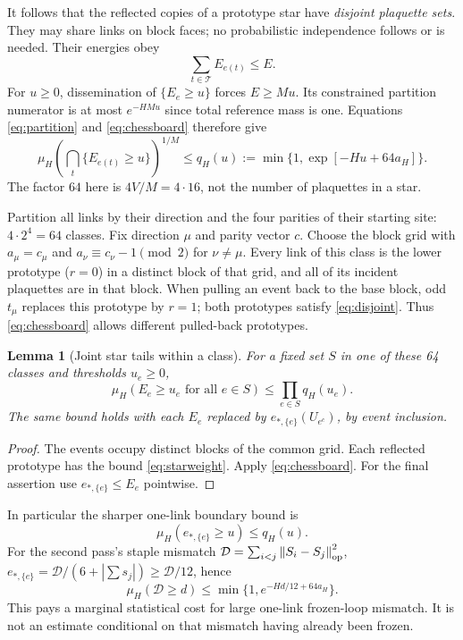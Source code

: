 \documentclass[11pt]{article}
\newtheorem{lemma}[theorem]{Lemma}
\theoremstyle{remark}
\newcommand{\norm}[1]{\left\lVert#1\right\rVert}
\begin{document}
It follows that the reflected copies of a prototype star have
\emph{disjoint plaquette sets}. They may share links on block faces;
no probabilistic independence follows or is needed. Their energies obey
\begin{equation}
 \sum_{t\in\mathcal T}E_{e(t)}\le E.
 \label{eq:disjoint}
\end{equation}
For $u\ge0$, dissemination of $\{E_e\ge u\}$ forces $E\ge Mu$.
Its constrained partition numerator is at most $e^{-HMu}$ since total
reference mass is one. Equations \eqref{eq:partition} and
\eqref{eq:chessboard} therefore give
\begin{equation}
 \mu_H\!\left(\bigcap_t\{E_{e(t)}\ge u\}\right)^{1/M}
 \le q_H(u):=\min\{1,\exp[-Hu+64a_H]\}.
 \label{eq:starweight}
\end{equation}
The factor $64$ here is $4V/M=4\cdot16$, not the number of plaquettes
in a star.

Partition all links by their direction and the four parities of their
starting site: $4\cdot2^4=64$ classes. Fix direction $\mu$ and parity
vector $c$. Choose the block grid with
$a_\mu=c_\mu$ and $a_\nu\equiv c_\nu-1\pmod2$ for $\nu\ne\mu$.
Every link of this class is the lower prototype ($r=0$) in a distinct
block of that grid, and all of its incident plaquettes are in that block.
When pulling an event back to the base block, odd $t_\mu$ replaces this
prototype by $r=1$; both prototypes satisfy \eqref{eq:disjoint}.
Thus \eqref{eq:chessboard} allows different pulled-back prototypes.

\begin{lemma}[Joint star tails within a class]\label{lem:classtails}
For a fixed set $S$ in one of these 64 classes and thresholds $u_e\ge0$,
\begin{equation}
 \mu_H(E_e\ge u_e\text{ for all }e\in S)
 \le\prod_{e\in S}q_H(u_e).
 \label{eq:classtails}
\end{equation}
The same bound holds with each $E_e$ replaced by
$e_{*,\{e\}}(U_{e^c})$, by event inclusion.
\end{lemma}
\begin{proof}
The events occupy distinct blocks of the common grid. Each reflected
prototype has the bound \eqref{eq:starweight}. Apply
\eqref{eq:chessboard}. For the final assertion use
$e_{*,\{e\}}\le E_e$ pointwise.
\end{proof}
In particular the sharper one-link boundary bound is
\begin{equation}
 \mu_H(e_{*,\{e\}}\ge u)\le q_H(u).
 \label{eq:singleminimum}
\end{equation}
For the second pass's staple mismatch
$\mathcal D=\sum_{i<j}\norm{S_i-S_j}_{\rm op}^2$,
$e_{*,\{e\}}=\mathcal D/(6+|\sum s_j|)\ge\mathcal D/12$, hence
\begin{equation}
 \mu_H(\mathcal D\ge d)\le\min\{1,e^{-Hd/12+64a_H}\}.
 \label{eq:mismatch}
\end{equation}
This pays a marginal statistical cost for large one-link frozen-loop
mismatch. It is not an estimate conditional on that mismatch having
already been frozen.
\end{document}
